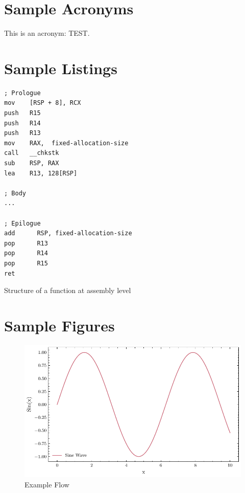 \section{Sample Acronyms}
\label{s:Acronyms}

This is an acronym: \acs{TEST}.

\section{Sample Listings}
\label{s:Listings}

\begin{listing}
\begin{verbatim}
; Prologue
mov    [RSP + 8], RCX
push   R15
push   R14
push   R13
mov    RAX,  fixed-allocation-size
call   __chkstk
sub    RSP, RAX
lea    R13, 128[RSP]

; Body
...

; Epilogue
add      RSP, fixed-allocation-size
pop      R13
pop      R14
pop      R15
ret
\end{verbatim}
\caption{Structure of a function at assembly level \cite{microsoft_corp_x64_2021}}
\label{listing:prolog-epilogl}
\end{listing}

\newpage

\section{Sample Figures}
\label{s:Figures}

\begin{figure}[ht]
\centering
\includegraphics[width=\textwidth,height=\textheight,keepaspectratio]{Python_plotting_example/example_1.pdf}
\caption{Example Flow}
\end{figure}


